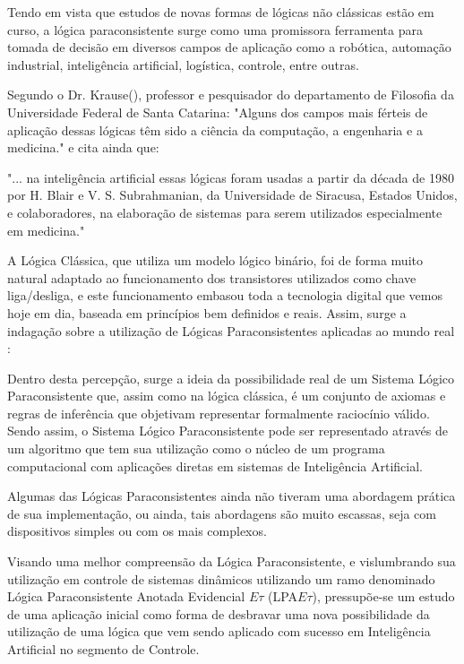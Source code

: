 
Tendo em vista que estudos de novas formas de lógicas não clássicas estão em curso, a lógica paraconsistente surge como uma promissora ferramenta para tomada de decisão em diversos campos de aplicação como a robótica, automação industrial, inteligência artificial, logística, controle, entre outras\cite{JoaoInacio}.
 
Segundo o Dr. Krause(\citeyear{DecioKrause}), professor e pesquisador do departamento de Filosofia da Universidade Federal de Santa Catarina: "Alguns dos campos mais férteis de aplicação dessas lógicas têm sido a ciência da computação, a engenharia e a medicina." e cita ainda que:
\begin{citacao}{
 "... na inteligência artificial essas lógicas foram usadas a partir da década de 1980 por H. Blair e V. S. Subrahmanian, da Universidade de Siracusa, Estados Unidos, e colaboradores, na elaboração de sistemas para serem utilizados especialmente em medicina." 
}
\end{citacao}

A Lógica Clássica, que utiliza um modelo lógico binário, foi de forma
muito natural adaptado ao funcionamento dos transistores utilizados
como chave liga/desliga, e este funcionamento embasou toda a
tecnologia digital que vemos hoje em dia, baseada em princípios bem
definidos e reais. Assim, surge a indagação sobre a utilização de
Lógicas Paraconsistentes aplicadas ao mundo real \cite{JISF2011}:

\begin{citacao}{
Dentro desta percepção, surge a ideia da possibilidade real de um Sistema Lógico Paraconsistente que, assim como na lógica clássica, é um conjunto de axiomas e regras de inferência que objetivam representar formalmente raciocínio válido. Sendo assim, o Sistema Lógico Paraconsistente pode ser representado através de um algoritmo que tem sua utilização como o núcleo de um programa computacional com aplicações diretas em sistemas de Inteligência Artificial.
}
\end{citacao}



Algumas das Lógicas Paraconsistentes ainda não tiveram  uma abordagem prática de sua implementação, ou ainda, tais abordagens são muito escassas, seja com dispositivos simples ou com os mais complexos. 


Visando uma melhor compreensão da Lógica Paraconsistente, 
e vislumbrando sua utilização em controle de sistemas dinâmicos 
utilizando um ramo denominado 
Lógica Paraconsistente Anotada Evidencial $E\tau$ (LPA$E\tau$), 
pressupõe-se um estudo de uma aplicação inicial 
como forma de desbravar uma nova possibilidade da utilização 
de uma lógica que vem sendo aplicado com sucesso em 
Inteligência Artificial no segmento de Controle.

